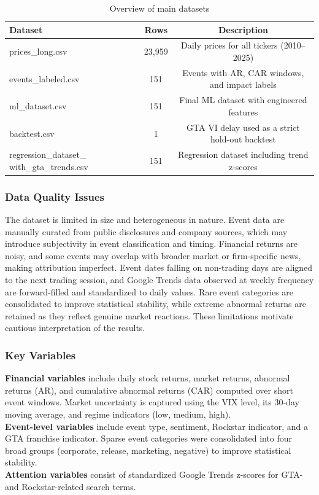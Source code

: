 \documentclass[11pt,a4paper]{article}
\begin{document}
\begin{table}[H]
\centering
\begin{tabular}{p{5cm} c c}
\textbf{Dataset} & \textbf{Rows} & \textbf{Description} \\
\hline
prices\_long.csv & 23,959 & Daily prices for all tickers (2010--2025) \\
events\_labeled.csv & 151 & Events with AR, CAR windows, and impact labels \\
ml\_dataset.csv & 151 & Final ML dataset with engineered features \\
backtest.csv & 1 & GTA VI delay used as a strict hold-out backtest \\
regression\_dataset\_ with\_gta\_trends.csv & 151 & Regression dataset including trend z-scores \\
\end{tabular}
\caption{Overview of main datasets}
\label{tab:dataset_overview}
\end{table}

\subsubsection{Data Quality Issues}

The dataset is limited in size and heterogeneous in nature. Event data are manually curated from public disclosures and company sources, which may introduce subjectivity in event classification and timing. Financial returns are noisy, and some events may overlap with broader market or firm-specific news, making attribution imperfect. Event dates falling on non-trading days are aligned to the next trading session, and Google Trends data observed at weekly frequency are forward-filled and standardized to daily values. Rare event categories are consolidated to improve statistical stability, while extreme abnormal returns are retained as they reflect genuine market reactions. These limitations motivate cautious interpretation of the results.

\subsubsection{Key Variables}

\textbf{Financial variables} include daily stock returns, market returns, abnormal returns (AR), and cumulative abnormal returns (CAR) computed over short event windows. Market uncertainty is captured using the VIX level, its 30-day moving average, and regime indicators (low, medium, high).
\\
\textbf{Event-level variables} include event type, sentiment, Rockstar indicator, and a GTA franchise indicator. Sparse event categories were consolidated into four broad groups (corporate, release, marketing, negative) to improve statistical stability.
\\
\textbf{Attention variables} consist of standardized Google Trends z-scores for GTA- and Rockstar-related search terms.
\end{document}
